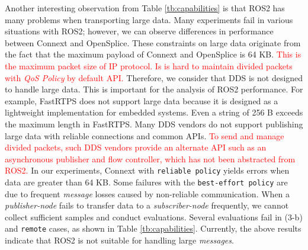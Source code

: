 \documentclass{sig-alternate-05-2015}
\begin{document}
Another interesting observation from Table \ref{tb:capabilities} is that ROS2 has many problems when transporting large data.
Many experiments fail in various situations with ROS2; however, we can observe differences in performance between Connext and OpenSplice.
These constraints on large data originate from the fact that the maximum payload of Connext and OpenSplice is 64 KB.
\textcolor{red}{This is the maximum packet size of IP protocol.
Is is hard to maintain divided packets with \emph{QoS Policy} by default API.}
Therefore, we consider that DDS is not designed to handle large data.
This is important for the analysis of ROS2 performance.
For example, FastRTPS does not support large data because it is designed as a lightweight implementation for embedded systems.
Even a string of 256 B exceeds the maximum length in FastRTPS.
Many DDS vendors do not support publishing large data with reliable connections and common APIs.
\textcolor{red}{To send and manage divided packets, such DDS vendors provide an alternate API such as an asynchronous publisher and flow controller, which has not been abstracted from ROS2.}
In our experiments, Connext with \texttt{reliable policy} yields errors when data are greater than 64 KB.
Some failures with the \texttt{best-effort policy} are due to frequent \emph{message} losses caused by non-reliable communication. 
When a \emph{publisher-node} fails to transfer data to a \emph{subscriber-node} frequently, we cannot collect sufficient samples and conduct evaluations.
Several evaluations fail in (3-b) and \texttt{remote} cases, as shown in Table \ref{tb:capabilities}.
Currently, the above results indicate that ROS2 is not suitable for handling large \emph{messages}.
\end{document}
